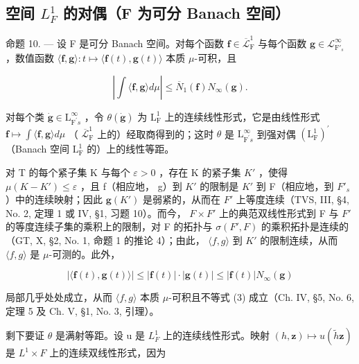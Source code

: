 \subsection{\texorpdfstring{空间 \(L_{F}^{1}\) 的对偶（F 为可分 Banach 空间）}{空间 L sub F superscript 1 的对偶（F 为可分 Banach 空间）}}

命题 10. --- 设 F 是可分 Banach 空间。对每个函数 \(\mathbf{f} \in \overline{\mathcal{L}}_{\mathrm{F}}^{1}\) 与每个函数 \(\mathbf{g} \in \mathcal{L}_{\mathrm{F}'_s}^{\infty}\) ，数值函数 \(\langle \mathbf{f}, \mathbf{g} \rangle : t \mapsto \langle \mathbf{f}(t), \mathbf{g}(t) \rangle\) 本质 \(\mu\)-可积，且

\[
\left| \int \langle \mathbf {f}, \mathbf {g} \rangle d \mu \right| \leqslant \overline {{{{N}}}} _ {1} (\mathbf {f}) N _ {\infty} (\mathbf {g}).\tag{3}
\]

对每个类 \(\dot{\mathbf{g}}\in\mathrm{L}_{\mathrm{F}^{\prime}s}^{\infty}\) ，令 \(\theta(\dot{\mathbf{g}})\) 为 \(\mathrm{L}_{\mathrm{F}}^{1}\) 上的连续线性形式，它是由线性形式 \(\mathbf{f}\mapsto\int\langle\mathbf{f},\mathbf{g}\rangle d\mu\) （ \(\overline{\mathcal{L}}_{\mathrm{F}}^{1}\) 上的）经取商得到的；这时 \(\theta\) 是 \(\mathrm{L}_{\mathrm{F}^{\prime}s}^{\infty}\) 到强对偶 \((\mathrm{L}_{\mathrm{F}}^{1})^{\prime}\) （Banach 空间 \(\mathrm{L}_{\mathrm{F}}^{1}\) 的）上的线性等距。

对 T 的每个紧子集 K 与每个 \(\varepsilon > 0\) ，存在 K 的紧子集 \(K'\) ，使得 \(\mu(K - K') \leqslant \varepsilon\) ，且 f（相应地， g）到 \(K'\) 的限制是 \(K'\) 到 F（相应地，到 \(F'_s\) ）中的连续映射；因此 \(\mathbf{g}(K')\) 是弱紧的，从而在 \(F'\) 上等度连续（TVS, III, §4, No. 2, 定理 1 或 IV, §1, 习题 10）。而今， \(F \times F'\) 上的典范双线性形式到 F 与 \(F'\) 的等度连续子集的乘积上的限制，对 F 的拓扑与 \(\sigma(F', F)\) 的乘积拓扑是连续的（GT, X, §2, No. 1, 命题 1 的推论 4）；由此， \(\langle f, g \rangle\) 到 \(K'\) 的限制连续，从而 \(\langle f, g \rangle\) 是 \(\mu\)-可测的。此外，

\[
| \langle \mathbf {f} (t), \mathbf {g} (t) \rangle | \leqslant | \mathbf {f} (t) | \cdot | \mathbf {g} (t) | \leqslant | \mathbf {f} (t) | N _ {\infty} (\mathbf {g})
\]

局部几乎处处成立，从而 \(\langle f,g\rangle\) 本质 \(\mu\)-可积且不等式 (3) 成立（Ch. IV, §5, No. 6, 定理 5 及 Ch. V, §1, No. 3, 引理）。

剩下要证 \(\theta\) 是满射等距。设 u 是 \(L_{F}^{1}\) 上的连续线性形式。映射 \((h,\mathbf{z})\mapsto u(\widetilde{h}\mathbf{z})\) 是 \(L^{1}\times F\) 上的连续双线性形式，因为

